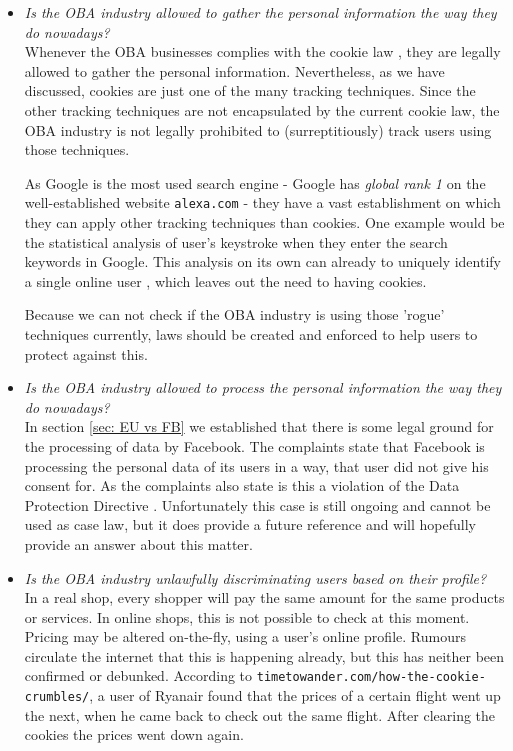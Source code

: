 \documentclass[11pt]{article}
\newcommand{\DPD}{Data Protection Directive }
\begin{document}
\begin{itemize}
	\item \textit{Is the OBA industry allowed to gather the personal information the way they do nowadays?}\\
Whenever the OBA businesses complies with the cookie law \cite{cookielaw}, they are legally allowed to gather the personal information. Nevertheless, as we have discussed, cookies are just one of the many tracking techniques. Since the other tracking techniques are not encapsulated by the current cookie law, the OBA industry is not legally prohibited to (surreptitiously) track users using those techniques. 

As Google is the most used search engine - Google has \textit{global rank 1} \cite{googlerank1} on the well-established website \texttt{alexa.com} - they have a vast establishment on which they can apply other tracking techniques than cookies. One example would be the statistical analysis of user's keystroke when they enter the search keywords in Google. This analysis on its own can already to uniquely identify a single online user \cite{keystroke}, which leaves out the need to having cookies.

Because we can not check if the OBA industry is using those 'rogue' techniques currently, laws should be created and enforced to help users to protect against this.

	\item \textit{Is the OBA industry allowed to process the personal information the way they do nowadays?}\\
In section \ref{sec: EU vs FB} we established that there is some legal ground for the processing of data by Facebook. The complaints state that Facebook is processing the personal data of its users in a way, that user did not give his consent for. As the complaints also state is this a violation of the \DPD. Unfortunately this case is still ongoing and cannot be used as case law, but it does provide a future reference and will hopefully provide an answer about this matter.
			
	\item \textit{Is the OBA industry unlawfully discriminating users based on their profile?}\\
In a real shop, every shopper will pay the same amount for the same products or services. In online shops, this is not possible to check at this moment. Pricing may be altered on-the-fly, using a user's online profile. Rumours circulate the internet that this is happening already, but this has neither been confirmed or debunked. According to \texttt{timetowander.com/how-the-cookie-crumbles/}, a user of Ryanair found that the prices of a certain flight went up the next, when he came back to check out the same flight. After clearing the cookies the prices went down again. 


\end{itemize}
\end{document}
